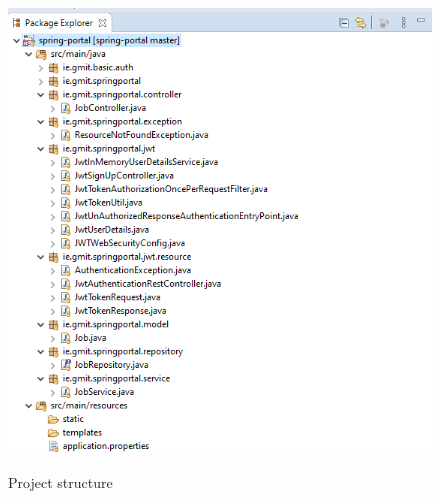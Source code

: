 \begin{figure}[ht]
    \centering
    \includegraphics[scale=0.7]{Images/setup.png} 
    \label{setup_label}
    \caption{Project structure}
\end{figure}
